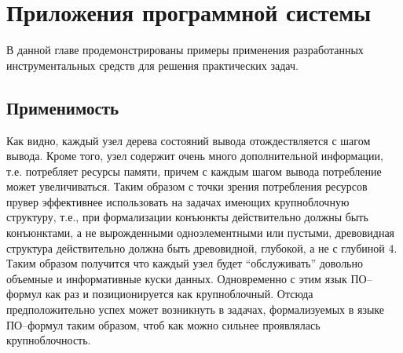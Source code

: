 \chapter{Приложения программной системы}
\label{part:examples}

В данной главе продемонстрированы примеры применения разработанных инструментальных средств  для решения практических задач. %

\section{Применимость}
Как видно, каждый узел дерева состояний вывода отождествляется с шагом вывода. Кроме того, узел содержит очень много дополнительной информации, т.е. потребляет ресурсы памяти, причем с каждым шагом вывода потребление может увеличиваться. Таким образом с точки зрения потребления ресурсов прувер эффективнее использовать на задачах имеющих крупноблочную структуру, т.е., при формализации конъюнкты действительно должны быть конъюнктами, а не вырожденными одноэлементными или пустыми, древовидная структура действительно должна быть древовидной, глубокой, а не с глубиной 4. Таким образом получится что каждый узел будет “обслуживать” довольно объемные и информативные куски данных. Одновременно с этим язык ПО--формул как раз и позиционируется как крупноблочный. Отсюда предположительно успех может возникнуть в задачах, формализуемых в языке ПО--формул таким образом, чтоб как можно сильнее проявлялась крупноблочность. %


